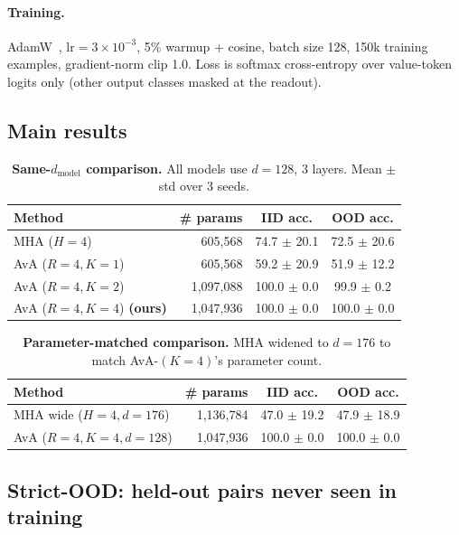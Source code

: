 \documentclass{article}
\begin{document}
\paragraph{Training.} AdamW~\citep{loshchilov2019adamw},
$\mathrm{lr}=3\!\times\!10^{-3}$, 5\% warmup + cosine,
batch size 128, 150k training examples, gradient-norm clip 1.0.
Loss is softmax cross-entropy over value-token logits only (other
output classes masked at the readout).

\subsection{Main results}

\begin{table}[h]
\centering
\caption{\textbf{Same-$d_{\text{model}}$ comparison.} All models use
$d = 128$, 3 layers. Mean $\pm$ std over 3 seeds.}
\label{tab:main}
\begin{tabular}{lrcc}
\toprule
Method & \# params & IID acc. & OOD acc. \\
\midrule
MHA ($H{=}4$)  & 605,568  & 74.7 $\pm$ 20.1  & 72.5 $\pm$ 20.6 \\
AvA ($R{=}4, K{=}1$)  & 605,568  & 59.2 $\pm$ 20.9  & 51.9 $\pm$ 12.2 \\
AvA ($R{=}4, K{=}2$)  & 1,097,088  & 100.0 $\pm$ 0.0  & 99.9 $\pm$ 0.2 \\
AvA ($R{=}4, K{=}4$) \textbf{(ours)}  & 1,047,936  & 100.0 $\pm$ 0.0  & 100.0 $\pm$ 0.0 \\
\bottomrule
\end{tabular}
\end{table}

\begin{table}[h]
\centering
\caption{\textbf{Parameter-matched comparison.} MHA widened to
$d{=}176$ to match AvA-$(K{=}4)$'s parameter count.}
\label{tab:matched}
\begin{tabular}{lrcc}
\toprule
Method & \# params & IID acc. & OOD acc. \\
\midrule
MHA wide ($H{=}4, d{=}176$)  & 1,136,784  & 47.0 $\pm$ 19.2  & 47.9 $\pm$ 18.9 \\
AvA ($R{=}4, K{=}4, d{=}128$)  & 1,047,936  & 100.0 $\pm$ 0.0  & 100.0 $\pm$ 0.0 \\
\bottomrule
\end{tabular}
\end{table}

\subsection{Strict-OOD: held-out pairs never seen in training}
\label{sec:strict}
\end{document}
